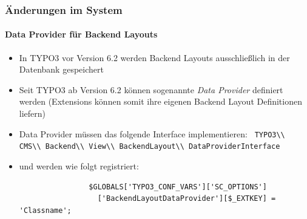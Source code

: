 \begin{frame}[fragile]
	\frametitle{Änderungen im System}
	\framesubtitle{Data Provider für Backend Layouts}

	\begin{itemize}
		\item In TYPO3 vor Version 6.2 werden Backend Layouts ausschließlich in der Datenbank gespeichert
		\item Seit TYPO3 ab Version 6.2 können sogenannte \emph{Data Provider} definiert werden\newline
			\small(Extensions können somit ihre eigenen Backend Layout Definitionen liefern)\normalsize

		\item Data Provider müssen das folgende Interface implementieren:\newline
			\smaller\texttt{
				TYPO3\textbackslash\textbackslash
				CMS\textbackslash\textbackslash
				Backend\textbackslash\textbackslash
				View\textbackslash\textbackslash
				BackendLayout\textbackslash\textbackslash
				DataProviderInterface}\normalsize

		\item und werden wie folgt registriert:

			\begin{lstlisting}
				$GLOBALS['TYPO3_CONF_VARS']['SC_OPTIONS']
				  ['BackendLayoutDataProvider'][$_EXTKEY] = 'Classname';
			\end{lstlisting}


	\end{itemize}

\end{frame}


